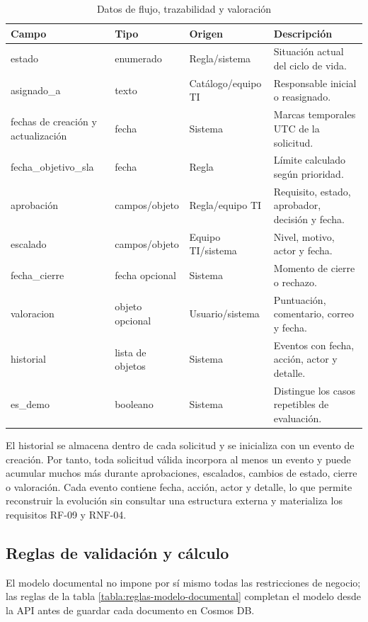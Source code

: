 \begin{table}[H]
\centering
\scriptsize
\begin{tabularx}{\textwidth}{l l l X}
\textbf{Campo} & \textbf{Tipo} & \textbf{Origen} & \textbf{Descripción} \\
\hline
estado & enumerado & Regla/sistema & Situación actual del ciclo de vida. \\
asignado\_a & texto & Catálogo/equipo TI & Responsable inicial o reasignado. \\
fechas de creación y actualización & fecha & Sistema & Marcas temporales UTC de la solicitud. \\
fecha\_objetivo\_sla & fecha & Regla & Límite calculado según prioridad. \\
aprobación & campos/objeto & Regla/equipo TI & Requisito, estado, aprobador, decisión y fecha. \\
escalado & campos/objeto & Equipo TI/sistema & Nivel, motivo, actor y fecha. \\
fecha\_cierre & fecha opcional & Sistema & Momento de cierre o rechazo. \\
valoracion & objeto opcional & Usuario/sistema & Puntuación, comentario, correo y fecha. \\
historial & lista de objetos & Sistema & Eventos con fecha, acción, actor y detalle. \\
es\_demo & booleano & Sistema & Distingue los casos repetibles de evaluación. \\
\end{tabularx}
\caption{Datos de flujo, trazabilidad y valoración}
\label{tabla:datos-solicitud-flujo}
\end{table}

El historial se almacena dentro de cada solicitud y se inicializa con un evento de creación. Por tanto, toda solicitud válida incorpora al menos un evento y puede acumular muchos más durante aprobaciones, escalados, cambios de estado, cierre o valoración. Cada evento contiene fecha, acción, actor y detalle, lo que permite reconstruir la evolución sin consultar una estructura externa y materializa los requisitos RF-09 y RNF-04.

\subsection{Reglas de validación y cálculo}

El modelo documental no impone por sí mismo todas las restricciones de negocio; las reglas de la tabla \ref{tabla:reglas-modelo-documental} completan el modelo desde la API antes de guardar cada documento en Cosmos DB.

